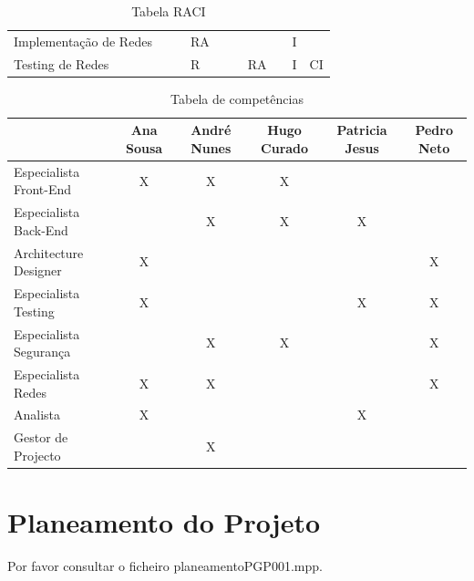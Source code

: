 \documentclass[a4paper]{report}
\begin{document}
\begin{table}[h]
\begin{adjustbox}{width=1.3\textwidth, center=\textwidth}
\begin{tabular}{l|l|l|l|l|l|l|l|l|l}
Implementação de Redes              &                           &                       & RA                    &                           &                          &                         &          & I                 &         \\
Testing de Redes                    &                           &                       & R                    &                           &                          & RA                      &          & I                 & CI      
\end{tabular}
\end{adjustbox}
\caption{Tabela RACI}
\end{table}

\begin{table}[h]
\centering
\label{my-label}
\begin{tabular}{l|c|c|c|c|c}
                       & Ana Sousa & André Nunes & Hugo Curado & Patricia Jesus & Pedro Neto \\ \hline
Especialista Front-End & X         & X           & X           &                &            \\ \hline
Especialista Back-End  &           & X           & X           & X              &            \\ \hline
Architecture Designer  & X         &             &             &                & X          \\ \hline
Especialista Testing   & X         &             &             & X              & X          \\ \hline
Especialista Segurança &           & X           & X           &                & X          \\ \hline
Especialista Redes     & X         & X           &             &                & X          \\ \hline
Analista               & X         &             &             & X              &            \\ \hline
Gestor de Projecto     &           & X            &             &                &            \\
\end{tabular}
\caption{Tabela de competências}
\end{table}

\pagebreak

\section{Planeamento do Projeto}
Por favor consultar o ficheiro planeamentoPGP001.mpp.
\end{document}
